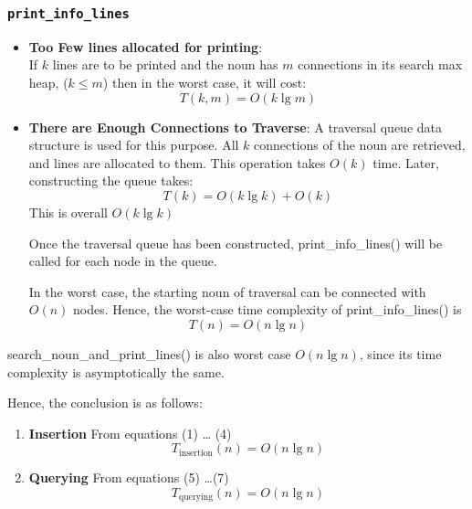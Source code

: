 \documentclass[conference]{IEEEtran}
\begin{document}
\subsubsection{\textbf{\texttt{print\_info\_lines}}}
    \begin{itemize}
        \item \textbf{Too Few lines allocated for printing}: 
\\If $k$ lines are to be printed
and the noun has $m$ connections in its search max heap, ($k \leq m$)
then in the worst case, it will cost:
\begin{equation}
	T(k, m) = O(k\lg m)
\end{equation}

\item \textbf{There are Enough Connections to Traverse}: 
A traversal queue data structure is used for this purpose.
All $k$ connections of the noun are retrieved, and lines are
allocated to them. This operation takes $O(k)$ time. Later,
constructing the queue takes:
\begin{equation}
    T(k) = O(k\lg k) + O(k)
\end{equation}
This is overall $O(k\lg k)$

Once the traversal queue has been constructed, print\_info\_lines() will be called for each node
in the queue.

In the worst case, the starting noun of traversal can be connected with $O(n)$ nodes. Hence, the worst-case time complexity of print\_info\_lines() is
\begin{equation}
    T(n) = O(n\lg n)
\end{equation}
\end{itemize}

search\_noun\_and\_print\_lines() is also worst case $O(n \lg n)$, since its time complexity is asymptotically the same.

Hence, the conclusion is as follows:
\begin{enumerate}
    \item \textbf{Insertion} From equations (1) \ldots 
 \space (4)
    \begin{equation*}
        T_{\text{insertion}}(n) = O(n\lg n) 
    \end{equation*}

    \item \textbf{Querying} From equations (5) \ldots \space (7) 
    \begin{equation*}
        T_{\text{querying}}(n) = O(n\lg n) 
    \end{equation*}
\end{enumerate}
\end{document}
